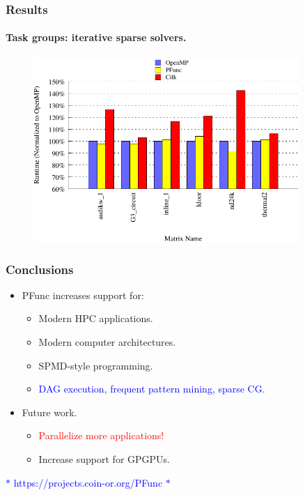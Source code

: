 \documentclass{beamer}
\begin{document}
\begin{frame}[fragile]
\frametitle{Results}
\framesubtitle{Task groups: iterative sparse solvers.}
\begin{figure}
\includegraphics[width=0.9\textwidth]{figs/cg_8}
\label{fig:cg}
\end{figure}
\end{frame}

\begin{frame}
\frametitle{Conclusions}
\begin{itemize}
\item PFunc increases support for:
  \begin{itemize}
  \item Modern HPC applications.
  \item Modern computer architectures.
  \item SPMD-style programming.
  \item \textcolor{blue}{DAG execution, frequent pattern mining, sparse CG.}
  \end{itemize}
\item Future work.
  \begin{itemize}
  \item \textcolor{red}{Parallelize more applications!}
  \item Increase support for GPGPUs.
  \end{itemize}
\end{itemize}
\vspace{+10pt}
\begin{center}
\textcolor{blue}{$\ast{}$ https://projects.coin-or.org/PFunc $\ast{}$}
\end{center}
\end{frame}
\end{document}
